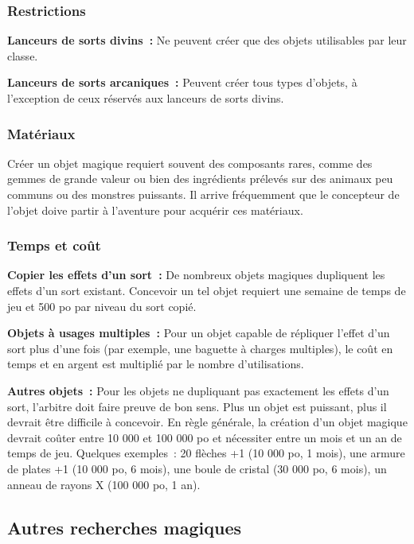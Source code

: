 \subsubsection{Restrictions}\label{restrictions-1}

\textbf{Lanceurs de sorts divins~:} Ne peuvent créer que des objets
utilisables par leur classe.

\textbf{Lanceurs de sorts arcaniques~:} Peuvent créer tous types
d'objets, à l'exception de ceux réservés aux lanceurs de sorts divins.

\subsubsection{Matériaux}\label{matuxe9riaux}

Créer un objet magique requiert souvent des composants rares, comme des
gemmes de grande valeur ou bien des ingrédients prélevés sur des animaux
peu communs ou des monstres puissants. Il arrive fréquemment que le
concepteur de l'objet doive partir à l'aventure pour acquérir ces
matériaux.

\subsubsection{Temps et coût}\label{temps-et-couxfbt-1}

\textbf{Copier les effets d'un sort~:} De nombreux objets magiques
dupliquent les effets d'un sort existant. Concevoir un tel objet
requiert une semaine de temps de jeu et 500 po par niveau du sort copié.

\textbf{Objets à usages multiples~:} Pour un objet capable de répliquer
l'effet d'un sort plus d'une fois (par exemple, une baguette à charges
multiples), le coût en temps et en argent est multiplié par le nombre
d'utilisations.

\textbf{Autres objets~:} Pour les objets ne dupliquant pas exactement
les effets d'un sort, l'arbitre doit faire preuve de bon sens. Plus un
objet est puissant, plus il devrait être difficile à concevoir. En règle
générale, la création d'un objet magique devrait coûter entre 10 000 et
100 000 po et nécessiter entre un mois et un an de temps de jeu.
Quelques exemples~: 20 flèches +1 (10 000 po, 1 mois), une armure de
plates +1 (10 000 po, 6 mois), une boule de cristal (30 000 po, 6 mois),
un anneau de rayons X (100 000 po, 1 an).

\subsection{Autres recherches magiques}\label{autres-recherches-magiques}

